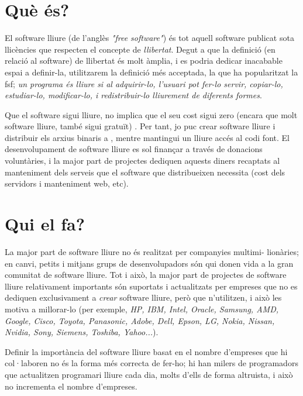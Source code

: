 \section{Què és?}

El software lliure (de l'anglès \emph{"free software"}) és tot aquell software publicat
sota llicències que respecten el concepte de \emph{llibertat}. Degut a que la definició
(en relació al software) de llibertat és molt àmplia, i es podria dedicar inacabable espai
a definir-la, utilitzarem la definició més acceptada, la que ha popularitzat la \ac{fsf}; \emph{un programa és lliure si al adquirir-lo, l'usuari pot fer-lo servir,
copiar-lo, estudiar-lo, modificar-lo, i redistribuir-lo lliurement de diferents formes}. \cite{wikifree}

Que el software sigui lliure, no implica que el seu cost sigui zero (encara que molt
software lliure, també sigui gratuït) \cite{sellingfree}. Per tant, jo puc crear software lliure i distribuir els arxius
binaris a , mentre mantingui un lliure accés al codi font. El desenvolupament de software
lliure es sol finançar a través de donacions voluntàries, i la major part de projectes dediquen
aquests diners recaptats al manteniment dels serveis que el software que distribueixen necessita
(cost dels servidors i manteniment web, etc).

\section{Qui el fa?}

La major part de software lliure no és realitzat per companyies multimi- lionàries; en canvi,
petits i mitjans grups de desenvolupadors són qui donen vida a la gran comunitat de software lliure.
Tot i això, la major part de projectes de software lliure relativament importants
són suportats i actualitzats per empreses que no es dediquen exclusivament a \emph{crear}
software lliure, però que n'utilitzen, i això les motiva a millorar-lo (per exemple, \emph{HP, IBM, Intel, Oracle, Samsung, AMD, Google, Cisco, Toyota, Panasonic, Adobe, Dell, Epson, LG, Nokia, Nissan, Nvidia, Sony, Siemens, Toshiba, Yahoo...}\cite{linuxmembers}).

Definir la importància del software lliure basat en el nombre d'empreses que hi col·laboren no és la forma més correcta de fer-ho; hi han milers de programadors que actualitzen programari lliure cada dia, molts d'ells de forma altruista, i això no incrementa el nombre d'empreses.

